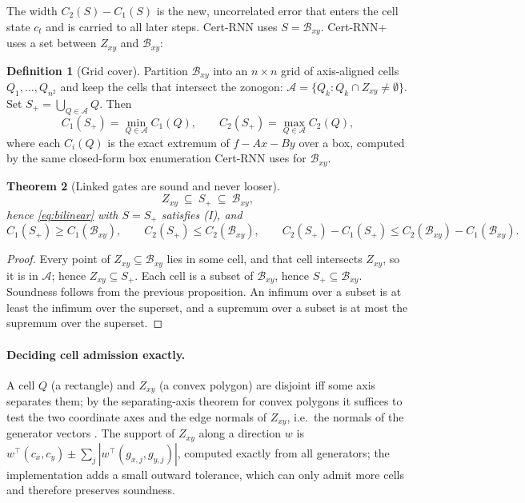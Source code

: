 \documentclass[11pt]{article}
\newtheorem{theorem}{Theorem}
\theoremstyle{definition}
\newtheorem{definition}[theorem]{Definition}
\theoremstyle{remark}
\newcommand{\Bx}{\mathcal{B}}
\newcommand{\abs}[1]{\left\lvert #1 \right\rvert}
\begin{document}
The width $C_2(S) - C_1(S)$ is the new, uncorrelated error that enters the cell state $c_t$ and is carried to all later steps. Cert-RNN uses $S = \Bx_{xy}$. Cert-RNN+ uses a set between $Z_{xy}$ and $\Bx_{xy}$:

\begin{definition}[Grid cover]
Partition $\Bx_{xy}$ into an $n\times n$ grid of axis-aligned cells $Q_{1},\dots,Q_{n^2}$ and keep the cells that intersect the zonogon: $\mathcal{A} = \{Q_k : Q_k\cap Z_{xy}\neq\emptyset\}$. Set $S_+ = \bigcup_{Q\in\mathcal{A}} Q$. Then
\begin{equation}
C_1(S_+) = \min_{Q\in\mathcal{A}} C_1(Q),\qquad C_2(S_+) = \max_{Q\in\mathcal{A}} C_2(Q),
\end{equation}
where each $C_i(Q)$ is the exact extremum of $f - Ax - By$ over a box, computed by the same closed-form box enumeration Cert-RNN uses for $\Bx_{xy}$.
\end{definition}

\begin{theorem}[Linked gates are sound and never looser]
\label{thm:gates}
\begin{equation}
Z_{xy}\ \subseteq\ S_+\ \subseteq\ \Bx_{xy},
\end{equation}
hence \eqref{eq:bilinear} with $S = S_+$ satisfies (I), and
\begin{equation}
C_1(S_+) \ge C_1(\Bx_{xy}),\qquad C_2(S_+) \le C_2(\Bx_{xy}),\qquad C_2(S_+) - C_1(S_+) \le C_2(\Bx_{xy}) - C_1(\Bx_{xy}).
\end{equation}
\end{theorem}
\begin{proof}
Every point of $Z_{xy}\subseteq\Bx_{xy}$ lies in some cell, and that cell intersects $Z_{xy}$, so it is in $\mathcal{A}$; hence $Z_{xy}\subseteq S_+$. Each cell is a subset of $\Bx_{xy}$, hence $S_+\subseteq\Bx_{xy}$. Soundness follows from the previous proposition. An infimum over a subset is at least the infimum over the superset, and a supremum over a subset is at most the supremum over the superset.
\end{proof}

\paragraph{Deciding cell admission exactly.} A cell $Q$ (a rectangle) and $Z_{xy}$ (a convex polygon) are disjoint iff some axis separates them; by the separating-axis theorem for convex polygons it suffices to test the two coordinate axes and the edge normals of $Z_{xy}$, i.e.\ the normals of the generator vectors \cite{gottschalk1996,ericson2004}. The support of $Z_{xy}$ along a direction $w$ is $w^\top(c_x,c_y) \pm \sum_j \abs{w^\top(g_{x,j},g_{y,j})}$, computed exactly from all generators; the implementation adds a small outward tolerance, which can only admit more cells and therefore preserves soundness.
\end{document}

